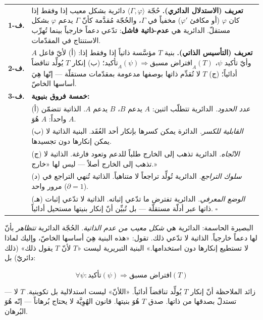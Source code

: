 \documentclass[10pt, openany, oneside]{book}
\renewcommand{\footnotesize}{\fontsize{8.5}{11}\selectfont}
\begin{document}
{\footnotesize
\noindent\begin{tabular}{r p{}}
\textbf{ف-1.} & \textbf{تعريف (الاستدلال الدائري).} حُجّة $\langle \Gamma, \varphi \rangle$ دائرية بشكل معيب إذا وفقط إذا كان $\varphi$ (أو مكافئ $\varphi'$) مخفياً في $\Gamma$، والحُجّة مُقدَّمة كأنّ $\Gamma$ يدعم $\varphi$ بشكل مستقلّ. الدائرية هي \textbf{عدم-ذاتية فاشل}: تدّعي دعماً خارجياً بينما تُهرِّب الاستنتاج في المقدّمات. \\[0.5em]
\textbf{ف-2.} & \textbf{تعريف (التأسيس الذاتي).} بنية $T$ مؤسَّسة ذاتياً إذا وفقط إذا: (أ) لأيّ فاعل $A$ وأيّ تأكيد $\psi$، $\text{تأكيد}_A(\psi) \Rightarrow \text{افتراض مسبق}_A(T)$؛ (ب) إنكار $T$ يُولِّد تناقضاً أدائياً؛ (ج) $T$ لا تُقدِّم ذاتها بوصفها مدعومة بمقدّمات مستقلّة --- إنّها هِيَ أساسها الخاصّ. \\[0.5em]
\textbf{ف-3.} & \textbf{خمسة فروق بنيوية:} \\[0.3em]
& (أ) \textit{عدد الحدود.} الدائرية تتطلّب اثنين: $A$ يدعم $B$، $B$ يدعم $A$. الذاتية تتضمّن واحداً: $A$ هُوَ $A$. \\[0.2em]
& (ب) \textit{القابلية للكسر.} الدائرة يمكن كسرها بإنكار أحد العُقَد. البنية الذاتية لا يمكن إنكارها دون تجسيدها. \\[0.2em]
& (ج) \textit{الاتّجاه.} الدائرية تذهب إلى الخارج طلباً للدعم وتعود فارغة. الذاتية لا تذهب إلى الخارج أصلاً --- ليس لها «خارج.» \\[0.2em]
& (د) \textit{سلوك التراجع.} الدائرية تُولِّد تراجعاً لا متناهياً. الذاتية تُنهي التراجع في مرور واحد ($\partial = 1$). \\[0.2em]
& (هـ) \textit{الوضع المعرفي.} الدائرية تفترض ما تدّعي إثباته. الذاتية لا تدّعي إثبات ذاتها عبر أدلّة مستقلّة --- بل تُبيِّن أنّ إنكار بنيتها مستحيل أدائياً. $\square$ \\[0.3em]
\end{tabular}
}

\vspace{0.8em}

\noindent البصيرة الحاسمة: الدائرية هي \textit{شكل معيب من عدم الذاتية}. الحُجّة الدائرية \textit{تتظاهر} بأنّ لها دعماً خارجياً. الذاتية لا تدّعي ذلك. تقول: «هذه البنية هِيَ أساسها الخاصّ، وإليك لماذا لا تستطيع إنكارها دون استخدامها.» البنية التبريرية ليست «$T$ لأنّ $T$ يقول ذلك» (ذلك دائريّ) بل:

$$\forall \psi: \text{تأكيد}(\psi) \Rightarrow \text{افتراض مسبق}(T)$$

--- زائد الملاحظة أنّ إنكار $T$ يُولِّد تناقضاً أدائياً. «اللأنّ» ليست استدلالية بل تكوينية. $T$ لا تستدلّ بصدقها من ذاتها. صدق $T$ هُوَ بنيتها. قانون الهُوِيَّة لا يحتاج بُرهاناً --- إنّه هُوَ البُرهان.
\end{document}
